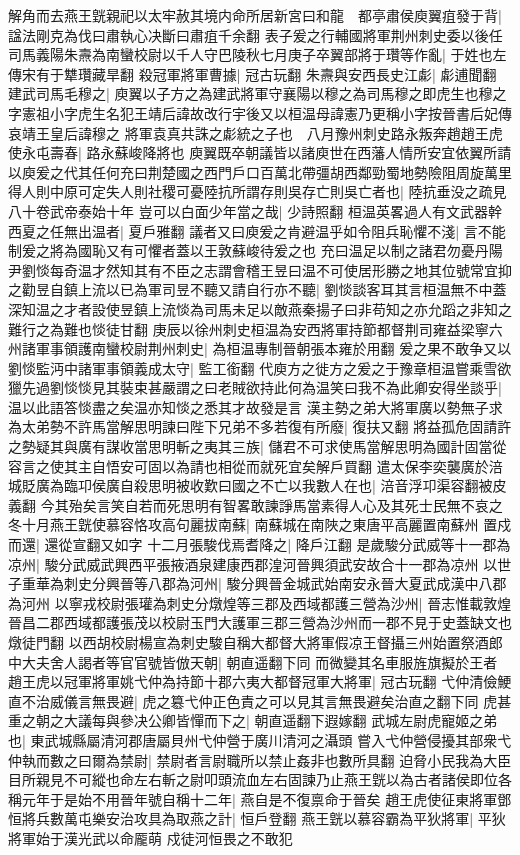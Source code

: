 解角而去燕王皝親祀以太牢赦其境内命所居新宮曰和龍　都亭肅侯庾翼疽發于背|{
	諡法剛克為伐曰肅執心决斷曰肅疽千余翻}
表子爰之行輔國將軍荆州刺史委以後任司馬義陽朱燾為南蠻校尉以千人守巴陵秋七月庚子卒翼部將于瓚等作亂|{
	于姓也左傳宋有于犨瓚藏旱翻}
殺冠軍將軍曹據|{
	冠古玩翻}
朱燾與安西長史江虨|{
	虨逋聞翻}
建武司馬毛穆之|{
	庾翼以子方之為建武將軍守襄陽以穆之為司馬穆之即虎生也穆之字憲祖小字虎生名犯王靖后諱故改行宇後又以桓温母諱憲乃更稱小字按晉書后妃傳哀靖王皇后諱穆之}
將軍袁真共誅之虨統之子也　八月豫州刺史路永叛奔趙趙王虎使永屯壽春|{
	路永蘇峻降將也}
庾翼既卒朝議皆以諸庾世在西藩人情所安宜依翼所請以庾爰之代其任何充曰荆楚國之西門戶口百萬北帶彊胡西鄰勁蜀地勢險阻周旋萬里得人則中原可定失人則社稷可憂陸抗所謂存則吳存亡則吳亡者也|{
	陸抗垂没之疏見八十卷武帝泰始十年}
豈可以白面少年當之哉|{
	少詩照翻}
桓温英畧過人有文武器幹西夏之任無出温者|{
	夏戶雅翻}
議者又曰庾爰之肯避温乎如令阻兵恥懼不淺|{
	言不能制爰之將為國恥又有可懼者蓋以王敦蘇峻待爰之也}
充曰温足以制之諸君勿憂丹陽尹劉惔每奇温才然知其有不臣之志謂會稽王昱曰温不可使居形勝之地其位號常宜抑之勸昱自鎮上流以已為軍司昱不聽又請自行亦不聽|{
	劉惔談客耳其言桓温無不中蓋深知温之才者設使昱鎮上流惔為司馬未足以敵燕秦揚子曰非苟知之亦允蹈之非知之難行之為難也惔徒甘翻}
庚辰以徐州刺史桓温為安西將軍持節都督荆司雍益梁寧六州諸軍事領護南蠻校尉荆州刺史|{
	為桓温專制晉朝張本雍於用翻}
爰之果不敢争又以劉惔監沔中諸軍事領義成太守|{
	監工銜翻}
代庾方之徙方之爰之于豫章桓温嘗乘雪欲獵先過劉惔惔見其裝束甚嚴謂之曰老賊欲持此何為温笑曰我不為此卿安得坐談乎|{
	温以此語答惔盡之矣温亦知惔之悉其才故發是言}
漢主勢之弟大將軍廣以勢無子求為太弟勢不許馬當解思明諫曰陛下兄弟不多若復有所廢|{
	復扶又翻}
將益孤危固請許之勢疑其與廣有謀收當思明斬之夷其三族|{
	儲君不可求使馬當解思明為國計固當從容言之使其主自悟安可固以為請也相從而就死宜矣解戶買翻}
遣太保李奕襲廣於涪城貶廣為臨卭侯廣自殺思明被收歎曰國之不亡以我數人在也|{
	涪音浮卭渠容翻被皮義翻}
今其殆矣言笑自若而死思明有智畧敢諫諍馬當素得人心及其死士民無不哀之冬十月燕王皝使慕容恪攻高句麗拔南蘇|{
	南蘇城在南陜之東唐平高麗置南蘇州}
置戍而還|{
	還從宣翻又如字}
十二月張駿伐焉耆降之|{
	降戶江翻}
是歲駿分武威等十一郡為凉州|{
	駿分武威武興西平張掖酒泉建康西郡湟河晉興須武安故合十一郡為凉州}
以世子重華為刺史分興晉等八郡為河州|{
	駿分興晉金城武始南安永晉大夏武成漢中八郡為河州}
以寧戎校尉張瓘為刺史分燉煌等三郡及西域都護三營為沙州|{
	晉志惟載敦煌晉昌二郡西域都護張茂以校尉玉門大護軍三郡三營為沙州而一郡不見于史蓋缺文也燉徒門翻}
以西胡校尉楊宣為刺史駿自稱大都督大將軍假凉王督攝三州始置祭酒郎中大夫舍人謁者等官官號皆倣天朝|{
	朝直遥翻下同}
而微變其名車服旌旗擬於王者　趙王虎以冠軍將軍姚弋仲為持節十郡六夷大都督冠軍大將軍|{
	冠古玩翻}
弋仲清儉鯁直不治威儀言無畏避|{
	虎之簒弋仲正色責之可以見其言無畏避矣治直之翻下同}
虎甚重之朝之大議每與參决公卿皆憚而下之|{
	朝直遥翻下遐嫁翻}
武城左尉虎寵姬之弟也|{
	東武城縣屬清河郡唐屬貝州弋仲營于廣川清河之灄頭}
嘗入弋仲營侵擾其部衆弋仲執而數之曰爾為禁尉|{
	禁尉者言尉職所以禁止姦非也數所具翻}
迫脅小民我為大臣目所親見不可縱也命左右斬之尉叩頭流血左右固諫乃止燕王皝以為古者諸侯即位各稱元年于是始不用晉年號自稱十二年|{
	燕自是不復禀命于晉矣}
趙王虎使征東將軍鄧恒將兵數萬屯樂安治攻具為取燕之計|{
	恒戶登翻}
燕王皝以慕容霸為平狄將軍|{
	平狄將軍始于漢光武以命龎萌}
戍徒河恒畏之不敢犯

